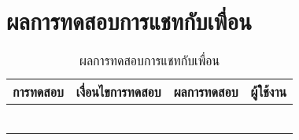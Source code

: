 \section{ผลการทดสอบการแชทกับเพื่อน}
\begin{table}[H]
	\caption{ผลการทดสอบการแชทกับเพื่อน}
    \centering	
	\label{tab:test25}
    \begin{tabular}{ | p{4cm} | p{4cm} | p{4cm} | p{2cm} | }
		\hline
	\multicolumn{1}{|c|}{การทดสอบ} & \multicolumn{1}{c|}{เงื่อนไขการทดสอบ} & \multicolumn{1}{c|}{ผลการทดสอบ} & \multicolumn{1}{c|}{ผู้ใช้งาน}                             \\ \hline
	\setstretch{1.0}{ทดสอบการแชทกับเพื่อน}
	& \setstretch{1.0}{ผู้ใช้ไม่กรอกข้อความ และกดส่งข้อความ}
	& \setstretch{1.0}{ระบบจะไม่ส่งข้อความ} 
	&\setstretch{1.0}{\begin{flushleft}ผู้ใช้งาน\end{flushleft}} \\ \cline{2-3} 
	& \setstretch{1.0}{ผู้ใช้กรอกข้อความ และส่งข้อความ}
	& \setstretch{1.0}{ระบบจะส่งข้อความ } 
	&\setstretch{1.0}{}\\ \cline{2-3} 
	& \setstretch{1.0}{ผู้ใช้เลือกรูปและกรอกข้อความ จากนั้นส่งข้อความ}
	& \setstretch{1.0}{ระบบจะส่งรูปและข้อความ และแสดงรูปและข้อความ } 
	&\setstretch{1.0}{}\\ \cline{2-3} 
	& \setstretch{1.0}{ผู้ใช้เลือกรูปและไม่กรอกข้อความ จากนั้นส่งข้อความ}
	& \setstretch{1.0}{ระบบจะส่งรูป และแสดงรูป } 
	&\setstretch{1.0}{}\\ \cline{2-3} 
	& \setstretch{1.0}{ผู้ใช้เลือกปุ่มลบข้อความ}
	& \setstretch{1.0}{ระบบจะลบข้อความ } 
	&\setstretch{1.0}{}\\ \cline{2-3} 
	& \setstretch{1.0}{ผู้ใช้เลือกปุ่มลบข้อความทั้งหมด}
	& \setstretch{1.0}{ระบบจะลบข้อความทั้งหมดระหว่างผู้ใช้งาน } 
	&\setstretch{1.0}{}\\ \cline{2-3} 
    \end{tabular}
\end{table}


